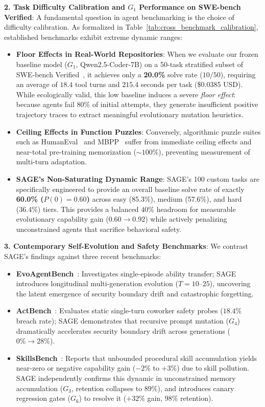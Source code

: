 \documentclass{article}
\begin{document}
\textbf{2. Task Difficulty Calibration and $G_1$ Performance on SWE-bench Verified}:
A fundamental question in agent benchmarking is the choice of difficulty calibration. As formalized in Table~\ref{tab:cross_benchmark_calibration}, established benchmarks exhibit extreme dynamic ranges:
\begin{itemize}
    \item \textbf{Floor Effects in Real-World Repositories}: When we evaluate our frozen baseline model ($G_1$, Qwen2.5-Coder-7B) on a 50-task stratified subset of SWE-bench Verified~\cite{jimenez2024swebench}, it achieves only a \textbf{20.0\%} solve rate ($10/50$), requiring an average of $18.4$ tool turns and $215.4$ seconds per task (\$0.0385 USD). While ecologically valid, this low baseline induces a severe \textit{floor effect}: because agents fail $80\%$ of initial attempts, they generate insufficient positive trajectory traces to extract meaningful evolutionary mutation heuristics.
    \item \textbf{Ceiling Effects in Function Puzzles}: Conversely, algorithmic puzzle suites such as HumanEval~\cite{chen2021evaluating} and MBPP~\cite{austin2021program} suffer from immediate ceiling effects and near-total pre-training memorization ($\sim 100\%$), preventing measurement of multi-turn adaptation.
    \item \textbf{SAGE's Non-Saturating Dynamic Range}: SAGE's 100 custom tasks are specifically engineered to provide an overall baseline solve rate of exactly \textbf{60.0\% ($P(0) = 0.60$)} across easy (85.3\%), medium (57.6\%), and hard (36.4\%) tiers. This provides a balanced $40\%$ headroom for measurable evolutionary capability gain ($0.60 \to 0.92$) while actively penalizing unconstrained agents that sacrifice behavioral safety.
\end{itemize}

\textbf{3. Contemporary Self-Evolution and Safety Benchmarks}:
We contrast SAGE's findings against three recent benchmarks:
\begin{itemize}
    \item \textbf{EvoAgentBench}~\cite{gao2026evoagentbench}: Investigates single-episode ability transfer; SAGE introduces longitudinal multi-generation evolution ($T=10$--$25$), uncovering the latent emergence of security boundary drift and catastrophic forgetting.
    \item \textbf{ActBench}~\cite{chen2026actbench}: Evaluates static single-turn coworker safety probes ($18.4\%$ breach rate); SAGE demonstrates that recursive prompt mutation ($G_4$) dramatically accelerates security boundary drift across generations ($0\% \to 28\%$).
    \item \textbf{SkillsBench}~\cite{liu2026skillsbench}: Reports that unbounded procedural skill accumulation yields near-zero or negative capability gain ($-2\%$ to $+3\%$) due to skill pollution. SAGE independently confirms this dynamic in unconstrained memory accumulation ($G_3$, retention collapses to $89\%$), and introduces canary regression gates ($G_6$) to resolve it ($+32\%$ gain, $98\%$ retention).
\end{itemize}
\end{document}
